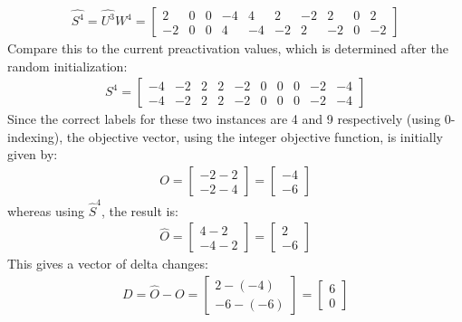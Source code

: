 \begin{align*}
    \hat{S^4} = \hat{U^3}W^4 = 
    \begin{bmatrix}
        2 & 0 & 0 & -4 & 4 & 2 & -2 & 2 & 0 & 2 \\
        -2 & 0 & 0 & 4 & -4 & -2 & 2 & -2 & 0 & -2
    \end{bmatrix}
\end{align*}
Compare this to the current preactivation values, which is determined after the random initialization:
\begin{align*}
    S^4 = 
    \begin{bmatrix}
        -4 & -2 & 2 & 2 & -2 & 0 & 0 & 0 & -2 & -4 \\
        -4 & -2 & 2 & 2 & -2 & 0 & 0 & 0 & -2 & -4
    \end{bmatrix}
\end{align*}
Since the correct labels for these two instances are 4 and 9 respectively (using 0-indexing), the objective vector, using the integer objective function, is initially given by:
\begin{align*}
    O = 
    \begin{bmatrix}
        -2 - 2 \\
        -2 - 4 
    \end{bmatrix}
    = 
    \begin{bmatrix}
        -4 \\
        -6 
    \end{bmatrix}
\end{align*}
whereas using $\hat{S}^4$, the result is:
\begin{align*}
    \hat{O} = 
    \begin{bmatrix}
        4 - 2 \\
        -4 -2 
    \end{bmatrix}
    = 
    \begin{bmatrix}
        2 \\
        -6 
    \end{bmatrix}
\end{align*}
This gives a vector of delta changes:
\begin{align*}
    D = \hat{O} - O = 
    \begin{bmatrix}
        2 - (-4) \\
        -6 - (-6) 
    \end{bmatrix}
    = 
    \begin{bmatrix}
        6 \\ 
        0 
    \end{bmatrix}
\end{align*}
